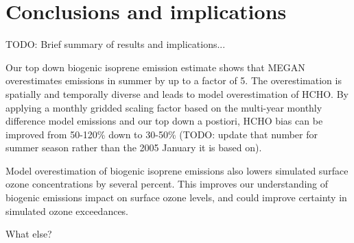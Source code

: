    
    
\section{Conclusions and implications}
  \label{BioIsop:conclusions}
  TODO: Brief summary of results and implications...
  
  Our top down biogenic isoprene emission estimate shows that MEGAN overestimates emissions in summer by up to a factor of 5.
  The overestimation is spatially and temporally diverse and leads to model overestimation of HCHO.
  By applying a monthly gridded scaling factor based on the multi-year monthly difference model emissions and our top down a postiori, HCHO bias can be improved from 50-120\% down to 30-50\% (TODO: update that number for summer season rather than the 2005 January it is based on).
  
  Model overestimation of biogenic isoprene emissions also lowers simulated surface ozone concentrations by several percent.
  This improves our understanding of biogenic emissions impact on surface ozone levels, and could improve certainty in simulated ozone exceedances.
  
  What else?



%  
  